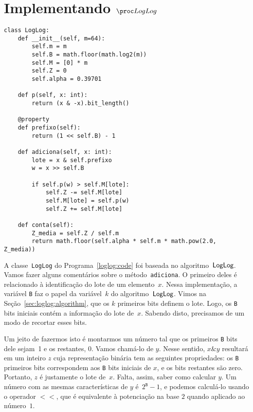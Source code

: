 \section{Implementando $\LOG$}

\begin{lstlisting}[style=mypython,caption=Implementação do algoritmo $\logprogram$,captionpos=b, label=loglog:code]
class LogLog:
    def __init__(self, m=64):
        self.m = m
        self.B = math.floor(math.log2(m))
        self.M = [0] * m
        self.Z = 0
        self.alpha = 0.39701
  
    def p(self, x: int):
        return (x & -x).bit_length()

    @property
    def prefixo(self):
        return (1 << self.B) - 1

    def adiciona(self, x: int):
        lote = x & self.prefixo
        w = x >> self.B

        if self.p(w) > self.M[lote]:
            self.Z -= self.M[lote]
            self.M[lote] = self.p(w)
            self.Z += self.M[lote]

    def conta(self):
        Z_media = self.Z / self.m
        return math.floor(self.alpha * self.m * math.pow(2.0, Z_media))
\end{lstlisting}

A classe~\texttt{LogLog} do Programa~\ref{loglog:code} foi baseada no algoritmo~$\textsf{LogLog}$. Vamos fazer alguns 
comentários sobre o método~\texttt{adiciona}. O primeiro deles é relacionado à identificação do lote de um elemento~$x$.
Nessa implementação, a variável \texttt{B} faz o papel da variável~$k$ do algoritmo~$\textsf{LogLog}$. Vimos na 
Seção~\ref{sec:loglog:algorithm}, que os $k$ primeiros bits definem o lote. Logo, os \texttt{B} bits iniciais contém a
informação do lote de~$x$. Sabendo disto, precisamos de um modo de recortar esses bits. 

Um jeito de fazermos isto é montarmos um número tal que os primeiros \texttt{B} bits dele sejam~1 e os restantes, 0. 
Vamos chamá-lo de $y$. Nesse sentido, $x \mathbin{\&} y$ resultará em um inteiro $z$ cuja representação binária tem as 
seguintes propriedades: os \texttt{B} primeiros bits correspondem aos \texttt{B} bits iniciais de $x$, e os bits 
restantes são zero. Portanto, $z$ é justamente o lote de~$x$. Falta, assim, saber como calcular $y$. Um número com as 
mesmas características de $y$ é~$2^{\texttt{B}} - 1$, e podemos calculá-lo usando o operador $<<$, que é equivalente à 
potenciação na base $2$ quando aplicado ao número~$1$.

